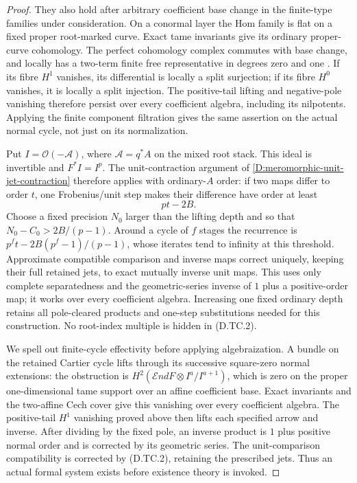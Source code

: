 \begin{proof}
They also hold after arbitrary coefficient
base change in the finite-type families
under consideration. On a conormal layer
the Hom family is flat on a fixed proper
root-marked curve. Exact tame invariants
give its ordinary proper-curve cohomology.
The perfect cohomology complex commutes
with base change, and locally has a
two-term finite free representative in
degrees zero and one
\citep[Lemma30.22.1, complete proof, Tag07VK]
{StacksUnitJetTransferD}. If its fibre $H^1$
vanishes, its differential is locally a
split surjection; if its fibre $H^0$
vanishes, it is locally a split injection.
The positive-tail lifting and negative-pole
vanishing therefore persist over every
coefficient algebra, including its nilpotents.
Applying the finite component filtration
gives the same assertion on the actual
normal cycle, not just on its normalization.

Put $I=\mathcal O(-\mathcal A)$, where
$\mathcal A=q^*A$ on the mixed root stack.
This ideal is invertible and $F^*I=I^p$.
The unit-contraction argument of
\ref{D:meromorphic-unit-jet-contraction}
therefore applies with ordinary-$A$ order:
if two maps differ to order $t$, one
Frobenius/unit step makes their difference
have order at least
\[
                              pt-2B.                    \tag{D.TC.2}
\]
Choose a fixed precision $N_0$ larger than
the lifting depth and so that
$N_0-C_0>2B/(p-1)$. Around a cycle of $f$
stages the recurrence is
$p^f t-2B(p^f-1)/(p-1)$, whose iterates
tend to infinity at this threshold.
Approximate compatible comparison and
inverse maps correct uniquely, keeping
their full retained jets, to exact mutually
inverse unit maps. This uses only complete
separatedness and the geometric-series
inverse of $1$ plus a positive-order map;
it works over every coefficient algebra.
Increasing one fixed ordinary depth
retains all pole-cleared products and
one-step substitutions needed for this
construction. No root-index multiple
is hidden in (D.TC.2).

We spell out finite-cycle effectivity
before applying algebraization. A bundle
on the retained Cartier cycle lifts
through its successive square-zero
normal extensions: the obstruction is
$H^2(\mathcal End F\otimes I^a/I^{a+1})$,
which is zero on the proper one-dimensional
tame support over an affine coefficient
base. Exact invariants and the two-affine
Cech cover give this vanishing over every
coefficient algebra. The positive-tail
$H^1$ vanishing proved above then lifts
each specified arrow and inverse. After
dividing by the fixed pole, an inverse
product is $1$ plus positive normal
order and is corrected by its geometric
series. The unit-comparison compatibility
is corrected by (D.TC.2), retaining the
prescribed jets. Thus an actual formal
system exists before existence theory
is invoked.


\end{proof}
